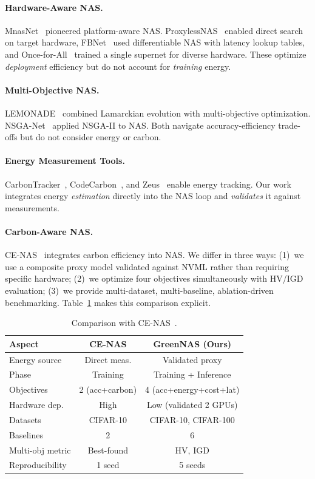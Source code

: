 \documentclass[10pt,twocolumn,letterpaper]{article}
\begin{document}
\paragraph{Hardware-Aware NAS.}
MnasNet~\cite{tan2019mnasnet} pioneered platform-aware NAS. ProxylessNAS~\cite{cai2019proxylessnas} enabled direct search on target hardware, FBNet~\cite{wu2019fbnet} used differentiable NAS with latency lookup tables, and Once-for-All~\cite{cai2020onceforall} trained a single supernet for diverse hardware. These optimize \emph{deployment} efficiency but do not account for \emph{training} energy.

\paragraph{Multi-Objective NAS.}
LEMONADE~\cite{elsken2019lemonade} combined Lamarckian evolution with multi-objective optimization. NSGA-Net~\cite{lu2019nsganet} applied NSGA-II to NAS. Both navigate accuracy-efficiency trade-offs but do not consider energy or carbon.

\paragraph{Energy Measurement Tools.}
CarbonTracker~\cite{anthony2020carbontracker}, CodeCarbon~\cite{schmidt2021codecarbon}, and Zeus~\cite{chung2023zeus} enable energy tracking. Our work integrates energy \emph{estimation} directly into the NAS loop and \emph{validates} it against measurements.

\paragraph{Carbon-Aware NAS.}
CE-NAS~\cite{zhao2024cenas} integrates carbon efficiency into NAS. We differ in three ways: (1)~we use a composite proxy model validated against NVML rather than requiring specific hardware; (2)~we optimize four objectives simultaneously with HV/IGD evaluation; (3)~we provide multi-dataset, multi-baseline, ablation-driven benchmarking. Table~\ref{tab:cenas} makes this comparison explicit.

\begin{table}[t]
\centering
\caption{Comparison with CE-NAS~\cite{zhao2024cenas}.}
\label{tab:cenas}
\small
\begin{tabular}{@{}lcc@{}}
\toprule
\textbf{Aspect} & \textbf{CE-NAS} & \textbf{GreenNAS (Ours)} \\
\midrule
Energy source & Direct meas. & Validated proxy \\
Phase & Training & Training + Inference \\
Objectives & 2 (acc+carbon) & 4 (acc+energy+cost+lat) \\
Hardware dep. & High & Low (validated 2 GPUs) \\
Datasets & CIFAR-10 & CIFAR-10, CIFAR-100 \\
Baselines & 2 & 6 \\
Multi-obj metric & Best-found & HV, IGD \\
Reproducibility & 1 seed & 5 seeds \\
\bottomrule
\end{tabular}
\end{table}
\end{document}
